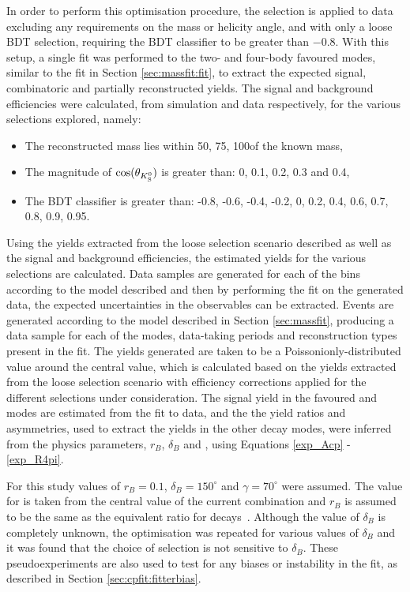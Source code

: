 In order to perform this optimisation procedure, the selection is applied to data excluding any requirements on the \Kstarm mass or \KS helicity angle, and with only a loose BDT selection, requiring the BDT classifier to be greater than $-0.8$. With this setup, a single fit was performed to the two- and four-body favoured modes, similar to the fit in Section \ref{sec:massfit:fit}, to extract the expected signal, combinatoric and partially reconstructed yields. The signal and background efficiencies were calculated, from simulation and data respectively, for the various selections explored, namely:

\begin{itemize}
\item{The reconstructed \Kstarm mass lies within 50\mevcc, 75\mevcc, 100\mevcc of the known \Kstarm mass,}
\item{The magnitude of $\cos(\theta_{{{K}^0_{\mathrm{ \scriptscriptstyle S}}}})$ is greater than: 0, 0.1, 0.2, 0.3 and 0.4,}
\item{The BDT classifier is greater than: -0.8, -0.6, -0.4, -0.2, 0, 0.2, 0.4, 0.6, 0.7, 0.8, 0.9, 0.95.}
\end{itemize}

Using the yields extracted from the loose selection scenario described as well as the signal and background efficiencies, the estimated yields for the various selections are calculated. Data samples are generated for each of the bins according to the model described and then by performing the \CP fit on the generated data, the expected uncertainties in the \CP observables can be extracted. Events are generated according to the model described in Section \ref{sec:massfit}, producing a data sample for each of the \Dz modes, data-taking periods and \KS reconstruction types present in the \CP fit. The yields generated are taken to be a Poissonionly-distributed value around the central value, which is calculated based on the yields extracted from the loose selection scenario with efficiency corrections applied for the different selections under consideration. The signal yield in the favoured \kpi and \kpipipi modes are estimated from the fit to data, and the the yield ratios and asymmetries, used to extract the yields in the other \Dz decay modes, were inferred from the physics parameters, $r_B$, $\delta_B$ and \Pgamma, using Equations \ref{exp_Acp} - \ref{exp_R4pi}. 

For this study values of $r_B = 0.1$, $\delta_B = 150^{\circ}$ and $\gamma = 70^{\circ}$ were assumed. The value for \Pgamma is taken from the central value of the current \lhcb combination and $r_B$ is assumed to be the same as the equivalent ratio for \decay{\Bm}{\D\Km} decays~\cite{LHCb-PAPER-2016-032}. Although the value of $\delta_B$ is completely unknown, the optimisation was repeated for various values of $\delta_B$ and it was found that the choice of selection is not sensitive to $\delta_B$.  These pseudoexperiments are also used to test for any biases or instability in the \CP fit, as described in Section \ref{sec:cpfit:fitterbias}.

